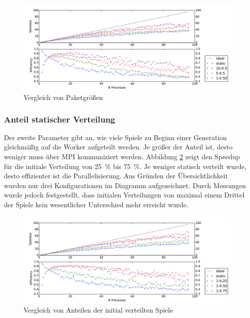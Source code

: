 \begin{figure}
    \centering
    \includegraphics[width=\textwidth]
        {content/img/strong_scaling_time_chunksize.pdf}
    \caption{Vergleich von Paketgrößen}
    \label{fig:speedup_chunksize}
\end{figure}

\subsubsection{Anteil statischer Verteilung}
Der zweite Parameter gibt an, wie viele Spiele zu Beginn einer Generation
gleichmäßig auf die Worker aufgeteilt werden. Je größer der Anteil ist, desto
weniger muss über MPI kommuniziert werden. Abbildung \ref{fig:speedup_initial}
zeigt den Speedup für die initiale Verteilung von \SI{25}{\percent} bis
\SI{75}{\percent}. Je weniger statisch verteilt wurde, desto effizienter ist
die Parallelisierung. Aus Gründen der Übersichtlichkeit wurden nur drei
Konfigurationen im Diagramm aufgezeichnet. Durch Messungen wurde jedoch
festgestellt, dass initialen Verteilungen von maximal einem Drittel der Spiele
kein wesentlicher Unterschied mehr erreicht wurde.

\begin{figure}
    \centering
    \includegraphics[width=\textwidth]
        {content/img/strong_scaling_time_initial.pdf}
    \caption{Vergleich von Anteilen der initial verteilten Spiele}
    \label{fig:speedup_initial}
\end{figure}

